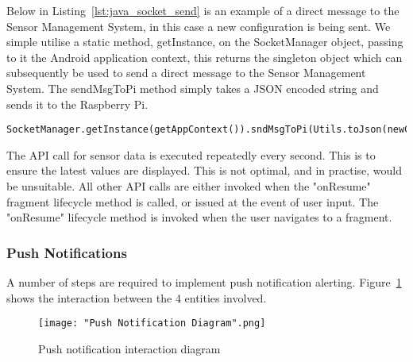 \documentclass{article}
\begin{document}
Below in Listing~\ref{lst:java_socket_send} is an example of a direct message to the Sensor Management System, in this case a new configuration is being sent. We simple utilise a static method, getInstance, on the SocketManager object, passing to it the Android application context, this returns the singleton object which can subsequently be used to send a direct message to the Sensor Management System. The sendMsgToPi method simply takes a JSON encoded string and sends it to the Raspberry Pi. 
\begin{lstlisting}[caption={Singleton SocketManager object send message method invocation},label={lst:java_socket_send}]
SocketManager.getInstance(getAppContext()).sndMsgToPi(Utils.toJson(newConfig);
\end{lstlisting}	

\noindent
The API call for sensor data is executed repeatedly every second. This is to ensure the latest values are displayed. This is not optimal, and in practise, would be unsuitable. All other API calls are either invoked when the "onResume" fragment lifecycle method is called, or issued at the event of user input. The "onResume" lifecycle method is invoked when the user navigates to a fragment. 


\newpage
\subsubsection{Push Notifications}
\label{sssec:android_push_notifications}
A number of steps are required to implement push notification alerting. Figure~\ref{fig:android_pn_interaction} shows the interaction between the 4 entities involved. 

\begin{figure}[H]
\centering
\texttt{[image: "Push Notification Diagram".png]}
\caption{Push notification interaction diagram}
\label{fig:android_pn_interaction}
\end{figure}
\end{document}
